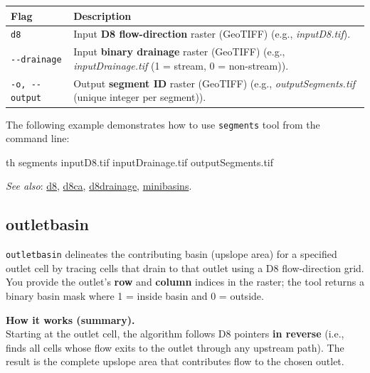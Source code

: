 \documentclass[
]{book}
\newenvironment{Shaded}{\begin{snugshade}}{\end{snugshade}}
\newcommand{\ExtensionTok}[1]{#1}
\newcommand{\NormalTok}[1]{#1}
\begin{document}
\begin{longtable}[]{@{}
  >{\raggedright\arraybackslash}p{}
  >{\raggedright\arraybackslash}p{}@{}}
\toprule\noalign{}
\begin{minipage}[b]{\linewidth}\raggedright
Flag
\end{minipage} & \begin{minipage}[b]{\linewidth}\raggedright
Description
\end{minipage} \\
\midrule\noalign{}
\endhead
\bottomrule\noalign{}
\endlastfoot
\texttt{d8} & Input \textbf{D8 flow-direction} raster (GeoTIFF) (e.g., \emph{inputD8.tif}). \\
\texttt{-\/-drainage} & Input \textbf{binary drainage} raster (GeoTIFF) (e.g., \emph{inputDrainage.tif} (1 = stream, 0 = non-stream)). \\
\texttt{-o,\ -\/-output} & Output \textbf{segment ID} raster (GeoTIFF) (e.g., \emph{outputSegments.tif} (unique integer per segment)). \\
\end{longtable}

The following example demonstrates how to use \texttt{segments} tool from the command line:

\begin{Shaded}
\begin{Highlighting}[]
\ExtensionTok{th}\NormalTok{ segments inputD8.tif inputDrainage.tif outputSegments.tif}
\end{Highlighting}
\end{Shaded}

\emph{See also}: \hyperref[d8]{d8}, \hyperref[d8ca]{d8ca}, \hyperref[d8drainage]{d8drainage}, \hyperref[minibasins]{minibasins}.

\subsection{outletbasin}\label{outletbasin}

\texttt{outletbasin} delineates the contributing basin (upslope area) for a specified outlet cell by tracing cells that drain to that outlet using a D8 flow-direction grid. You provide the outlet's \textbf{row} and \textbf{column} indices in the raster; the tool returns a binary basin mask where 1 = inside basin and 0 = outside.

\textbf{How it works (summary).}\\
Starting at the outlet cell, the algorithm follows D8 pointers \textbf{in reverse} (i.e., finds all cells whose flow exits to the outlet through any upstream path). The result is the complete upslope area that contributes flow to the chosen outlet.
\end{document}
